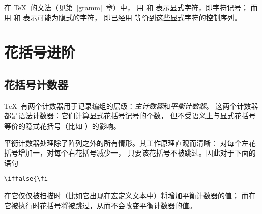 \documentclass{book}
\begin{document}
在 \TeX\ 的文法（见第~\ref{gramm}~章）中，
用  和  表示显式字符，即字符记号；
而用 \n{\lb} 和 \n{\rb} 表示可能为隐式的字符，
即已经用  等价到这些显式字符的控制序列。

\section{花括号进阶}

\subsection{花括号计数器}

\TeX\ 有两个计数器用于记录编组的层级：{\it 主计数器}和{\it 平衡计数器}。
这两个计数器都是语法计数器：它们计算显式花括号记号的个数，
但不受语义上与显式花括号等价的隐式花括号（比如 ）的影响。

平衡计数器处理除了阵列之外的所有情形。其工作原理直观而清晰：
对每个左花括号增加一，对每个右花括号减少一，
只要该花括号不被跳过。因此对于下面的语句
\begin{verbatim}
\iffalse{\fi
\end{verbatim}
在它仅仅被扫描时（比如它出现在宏定义文本中）将增加平衡计数器的值；
而在它被执行时花括号将被跳过，从而不会改变平衡计数器的值。
\end{document}
